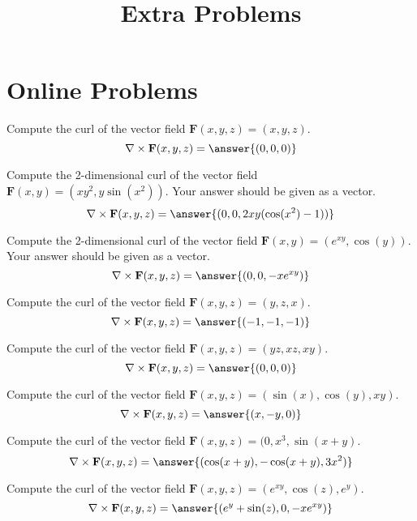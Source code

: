\documentclass{ximera}
\title{Extra Problems}
\begin{document}
\begin{abstract}
\end{abstract}
\maketitle
\section{Online Problems}
\begin{problem}
Compute the curl of the vector field $\mathbf{F}(x,y,z) = (x,y,z)$.
\[
\nabla\times\mathbf{F}(x,y,z) = \answer{(0,0,0)}
\]
\end{problem}

\begin{problem}
Compute the 2-dimensional curl of the vector field $\mathbf{F}(x,y) = (xy^2,y\sin(x^2))$. Your answer should be given as a vector.
\[
\nabla\times\mathbf{F}(x,y,z) = \answer{(0,0,2xy(\cos(x^2)-1))}
\]
\end{problem}

\begin{problem}
Compute the 2-dimensional curl of the vector field $\mathbf{F}(x,y) = (e^{xy},\cos(y))$. Your answer should be given as a vector.
\[
\nabla\times\mathbf{F}(x,y,z) = \answer{(0,0,-xe^{xy})}
\]
\end{problem}

\begin{problem}
Compute the curl of the vector field $\mathbf{F}(x,y,z) = (y,z,x)$.
\[
\nabla\times\mathbf{F}(x,y,z) = \answer{(-1,-1,-1)}
\]
\end{problem}

\begin{problem}
Compute the curl of the vector field $\mathbf{F}(x,y,z) = (yz,xz,xy)$.
\[
\nabla\times\mathbf{F}(x,y,z) = \answer{(0,0,0)}
\]
\end{problem}

\begin{problem}
Compute the curl of the vector field $\mathbf{F}(x,y,z) = (\sin(x),\cos(y),xy)$.
\[
\nabla\times\mathbf{F}(x,y,z) = \answer{(x,-y,0)}
\]
\end{problem}

\begin{problem}
Compute the curl of the vector field $\mathbf{F}(x,y,z) = (0,x^3,\sin(x+y)$.
\[
\nabla\times\mathbf{F}(x,y,z) = \answer{(\cos(x+y),-\cos(x+y),3x^2)}
\]
\end{problem}

\begin{problem}
Compute the curl of the vector field $\mathbf{F}(x,y,z) = (e^{xy},\cos(z),e^{y})$.
\[
\nabla\times\mathbf{F}(x,y,z) = \answer{(e^y+\sin(z),0,-xe^{xy})}
\]
\end{problem}
\end{document}
